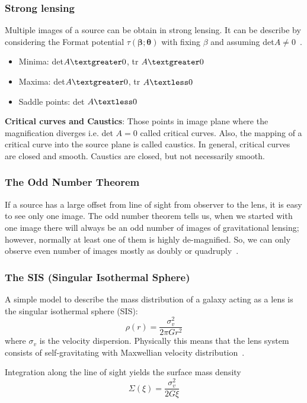 \subsubsection{Strong lensing}
Multiple images of a source can be obtain in strong lensing. It can be  describe by considering the Format potential $\tau(\pmb\beta;\pmb\theta) $ with fixing $\beta$ and assuming det$ A \ne 0$~\cite{manual}.

\begin{itemize}
	\item Minima: det$ A\textgreater 0$, tr $A\textgreater 0$
	\item Maxima: det$ A\textgreater 0$, tr $A\textless 0$
	\item Saddle points: det $A\textless 0$
\end{itemize}
\noindent
\textbf{Critical curves and Caustics}: Those points in image plane where the magnification diverges i.e. det $A=0  $ called critical curves. Also, the mapping of a critical curve into the source plane is called caustics. In general, critical curves are closed and smooth. Caustics are closed, but not necessarily smooth.

\subsubsection{The Odd Number Theorem}
If a source has a large offset from line of sight from observer to the lens, it is easy to see only one image. The odd number theorem tells us, when we started with one image there will always be an odd number of images of gravitational lensing; however, normally at least one of them is highly de-magnified. So, we can only observe even number of images mostly as doubly or quadruply~\cite{manual}.

\subsubsection{The SIS (Singular Isothermal Sphere)}
A simple model to describe the mass distribution of a galaxy acting as a lens is the singular isothermal sphere (SIS):
\begin{equation}
\rho(r)=\frac{\sigma_{v}^{2}}{2\pi G r^2}
\label{equ:SIS}
\end{equation}
where $ \sigma_{v} $ is the velocity dispersion. Physically this means that the lens system consists of self-gravitating with Maxwellian velocity distribution~\cite{Schneider}.

Integration along the line of sight yields the surface mass density
\begin{equation}
\Sigma(\xi)=\frac{\sigma^2_{v}}{2G\xi}
\label{equ:Sigma(xi)}
\end{equation}


